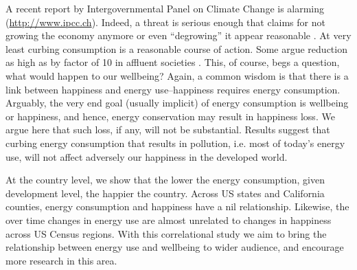 \documentclass[10pt, letterpaper]{article}
\begin{document}
\begin{spacing}{1.4}
A recent report by
Intergovernmental Panel on Climate Change is alarming 
(\url{http://www.ipcc.ch}). %
Indeed, a threat is serious enough that
claims for not growing the economy anymore or even ``degrowing'' it
appear reasonable \cite{kallis11, kallis12}. %
At very
least curbing consumption is a reasonable course of action. Some argue reduction as high
as by factor of 10 in affluent societies \cite{pretty13}. This,
of course, begs a question, what would happen to our wellbeing?
 Again, a common %
wisdom is that there is a link between happiness and
energy use--happiness requires energy consumption.
Arguably, the very end goal (usually implicit)
of energy consumption is wellbeing or happiness, and hence,  %
%
 energy conservation may result in happiness loss.
 We argue here that such loss, if
any,  will
not be substantial. Results suggest that curbing energy consumption that results
in pollution, i.e. most of today's energy use, will not affect adversely our
happiness in the developed world.  %

At the country level, we show that the lower the energy consumption, given development
level, the happier the country.  Across US states and California counties,
energy consumption and happiness have a nil relationship. 
Likewise, the over time changes in energy use are almost unrelated to changes in
 happiness across US Census regions. 
With this correlational study we aim to bring the relationship between energy
use and wellbeing to wider audience, and encourage more research in this area. 


\end{spacing}
\end{document}
